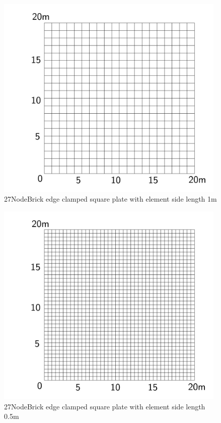 \documentclass[fleqn,11pt]{article}
\begin{document}
\newpage

\begin{figure}[H]
  \centering
  \includegraphics[width=11cm]{../Figure-files/square_plate4.pdf}
  \caption{27NodeBrick edge clamped square plate with element side length 1m }
  \label{fig 27NodeBrick edges clamped square plate with element side length 1m }
\end{figure}


\begin{figure}[H]
  \centering
  \includegraphics[width=11cm]{../Figure-files/square_plate5.pdf}
  \caption{27NodeBrick edge clamped square plate with element side length 0.5m }
  \label{fig 27NodeBrick edges clamped square plate with element side length 0.5m }
\end{figure}
\end{document}
